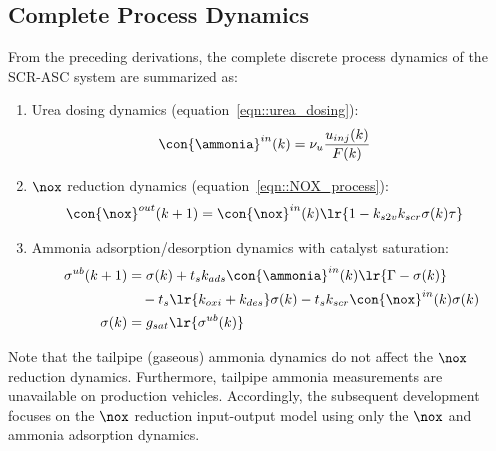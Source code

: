 \subsection{Complete Process Dynamics \label{sec::complete_proc_dyn}}

From the preceding derivations, the complete discrete process dynamics of the SCR-ASC system are summarized as:
\begin{enumerate}
    \item Urea dosing dynamics (equation~\ref{eqn::urea_dosing}):
    \begin{align}
    \con{\ammonia}^{in} (k) &= \nu_u \frac{u_{inj}(k)}{F(k)}
    \end{align}

    \item $\nox$ reduction dynamics (equation~\ref{eqn::NOX_process}):
    \begin{align}
    \con{\nox}^{out} (k + 1) &= \con{\nox}^{in} (k) \lr{1 - k_{s2v} k_{scr} \sigma(k) \tau}
    \end{align}

    \item Ammonia adsorption/desorption dynamics with catalyst saturation:
    \begin{align}
        \sigma^{ub}(k+1) &= \sigma(k) + t_s k_{ads} \con{\ammonia}^{in} (k) \lr{\Gamma - \sigma(k)} \notag \\
                         & \quad - t_s \lr{k_{oxi} + k_{des}} \sigma(k) - t_s k_{scr} \con{\nox}^{in}(k) \sigma(k)
                \label{eqn::sigma_process}\\
        \sigma(k) &= g_{sat} \lr{\sigma^{ub}(k)}  \label{eqn::sigma_sat}
    \end{align}
\end{enumerate}

Note that the tailpipe (gaseous) ammonia dynamics do not affect the $\nox$ reduction dynamics. Furthermore, tailpipe
ammonia measurements are unavailable on production vehicles. Accordingly, the subsequent development focuses on the
$\nox$ reduction input-output model using only the $\nox$ and ammonia adsorption dynamics.

